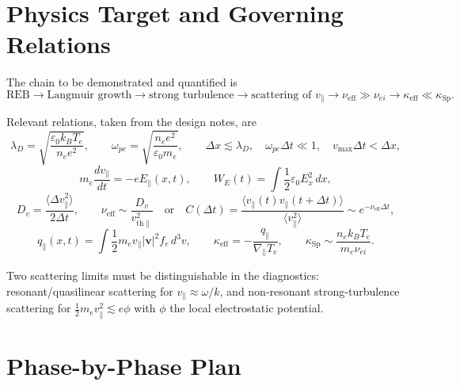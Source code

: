 \documentclass[11pt,a4paper]{article}
\begin{document}
\section{Physics Target and Governing Relations}

The chain to be demonstrated and quantified is
\begin{equation}
\text{REB} \rightarrow \text{Langmuir growth} \rightarrow \text{strong turbulence}
\rightarrow \text{scattering of } v_\parallel \rightarrow \nu_{\mathrm{eff}} \gg \nu_{ei}
\rightarrow \kappa_{\mathrm{eff}} \ll \kappa_{\mathrm{Sp}} .
\end{equation}

Relevant relations, taken from the design notes, are
\begin{equation}
\lambda_D = \sqrt{\frac{\varepsilon_0 k_B T_e}{n_e e^2}}, \qquad
\omega_{pe} = \sqrt{\frac{n_e e^2}{\varepsilon_0 m_e}}, \qquad
\Delta x \lesssim \lambda_D,\quad \omega_{pe}\Delta t \ll 1,\quad v_{\max}\Delta t < \Delta x ,
\end{equation}
\begin{equation}
m_e\frac{dv_\parallel}{dt} = -e E_\parallel(x,t), \qquad
W_E(t) = \int \frac{1}{2}\varepsilon_0 E_x^2\,dx ,
\end{equation}
\begin{equation}
D_v = \frac{\langle \Delta v_\parallel^2\rangle}{2\Delta t},\qquad
\nu_{\mathrm{eff}} \sim \frac{D_v}{v_{\mathrm{th}\parallel}^2}
\quad\text{or}\quad
C(\Delta t)=\frac{\langle v_\parallel(t)v_\parallel(t+\Delta t)\rangle}
{\langle v_\parallel^2\rangle} \sim e^{-\nu_{\mathrm{eff}}\Delta t},
\end{equation}
\begin{equation}
q_\parallel(x,t)=\int \frac{1}{2}m_e v_\parallel |\mathbf{v}|^2 f_e\,d^3v,\qquad
\kappa_{\mathrm{eff}} = -\frac{q_\parallel}{\nabla_\parallel T_e}, \qquad
\kappa_{\mathrm{Sp}} \sim \frac{n_e k_B T_e}{m_e \nu_{ei}} .
\end{equation}

Two scattering limits must be distinguishable in the diagnostics: resonant/quasilinear scattering
for $v_\parallel \approx \omega/k$, and non-resonant strong-turbulence scattering for
$\frac{1}{2}m_e v_\parallel^2 \lesssim e\phi$ with $\phi$ the local electrostatic potential.

\section{Phase-by-Phase Plan}
\end{document}
